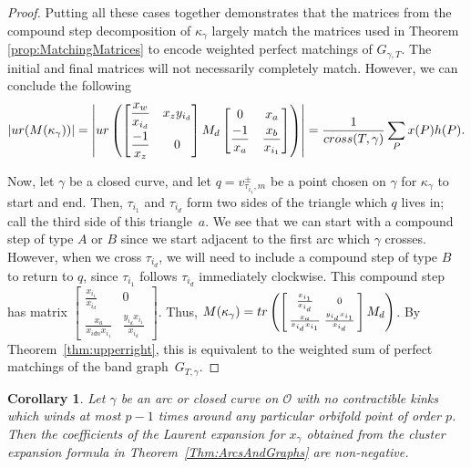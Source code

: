 \documentclass[11pt]{article}
\newcommand{\ur}{{\rm ur}}
\numberwithin{equation}{section}
\newtheorem{Corollary}[Theorem]{Corollary}
\begin{document}
\begin{proof}
Putting all these cases together demonstrates that the matrices from the compound step decomposition of $\kappa_\gamma$ largely match the matrices used in Theorem \ref{prop:MatchingMatrices} to encode weighted perfect matchings of $G_{\gamma, T}$. The initial and final matrices will not necessarily completely match. However, we can conclude the following \[\vert {\rm ur}(M(\kappa_\gamma)) \vert = \left| \ur\left( \begin{bmatrix} \dfrac{x_w}{x_{i_d}} & x_z y_{i_d} \vspace{1mm}\\ \dfrac{-1}{x_z} & 0 \end{bmatrix} M_d \begin{bmatrix} 0 & x_a \vspace{1mm}\\ \dfrac{-1}{x_a} & \dfrac{x_b}{x_{i_1}} \end{bmatrix} \right) \right| =\frac{1}{{\rm cross}(T,\gamma)} \sum_P x(P) h(P).
\]

Now, let $\gamma$ be a closed curve, and let $q = v_{\tau_{i_1},m}^\pm$ be a point chosen on $\gamma$ for $\kappa_\gamma$ to start and end. Then, $\tau_{i_1}$ and $\tau_{i_d}$ form two sides of the triangle which $q$ lives in; call the third side of this triangle~$a$. We see that we can start with a compound step of type $A$ or $B$ since we start adjacent to the first arc which $\gamma$ crosses. However, when we cross $\tau_{i_d}$, we will need to include a compound step of type $B$ to return to $q$, since $\tau_{i_1}$ follows $\tau_{i_d}$ immediately clockwise. This compound step has matrix $\left[\begin{smallmatrix} \frac{x_{i_1}}{x_{i_d}}& 0 \\ \frac{x_{a}}{x_{idn}x_{i_{1}}} & \frac{y_{i_d}x_{i_1}}{x_{i_d}} \end{smallmatrix}\right]$. Thus, $M(\kappa_\gamma) = {\rm tr}\left(\left[\begin{smallmatrix} \frac{x_{i_1}}{x_{i_d}}& 0 \\ \frac{x_{a}}{x_{i_d}x_{i_{1}}} & \frac{y_{i_d}x_{i_1}}{x_{i_d}} \end{smallmatrix}\right] M_d \right)$. By Theorem~\ref{thm:upperright}, this is equivalent to the weighted sum of perfect matchings of the band graph~$G_{T,\gamma}$.
\end{proof}

\begin{Corollary}
Let $\gamma$ be an arc or closed curve on $\mathcal{O}$ with no contractible kinks which winds at most $p-1$ times around any particular orbifold point of order $p$. Then the coefficients of the Laurent expansion for $x_{\gamma}$ obtained from the cluster expansion formula in Theorem~{\rm \ref{Thm:ArcsAndGraphs}} are non-negative.
\end{Corollary}
\end{document}
